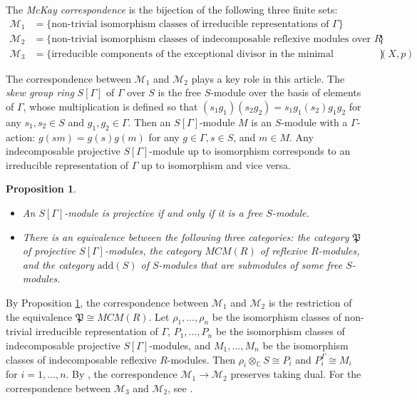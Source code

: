 \documentclass{amsart}[12pt]
\newtheorem{prop}[theorem]{Proposition}
\theoremstyle{definition}
\theoremstyle{remark}
\numberwithin{equation}{section}
\begin{document}
The \textit{McKay correspondence} is the bijection of the following three finite sets:
\begin{align*}
\mathcal{M}_1 & = \{\textrm{non-trivial isomorphism classes of irreducible representations of $\Gamma$}\} \\
\mathcal{M}_2 & = \{\textrm{non-trivial isomorphism classes of indecomposable reflexive modules over $R$}\} \\
\mathcal{M}_3 & = \{\textrm{irreducible components of the exceptional divisor in the minimal resolution of $(X, p)$}\}
\end{align*}

The correspondence between $\mathcal{M}_1$ and $\mathcal{M}_2$ plays a key role in this article. The \textit{skew group ring} $S[\Gamma]$ of $\Gamma$ over $S$ is the free $S$-module over the basis of elements of $\Gamma$, whose multiplication is defined so that $(s_1g_1)(s_2g_2) = s_1g_1(s_2)g_1g_2$ for any $s_1, s_2 \in S$ and $g_1, g_2 \in \Gamma$. Then an $S[\Gamma]$-module $M$ is an $S$-module with a $\Gamma$-action: $g(sm) = g(s)g(m)$ for any $g \in \Gamma, s \in S$, and $m \in M$. Any indecomposable projective $S[\Gamma]$-module up to isomorphism corresponds to an irreducible representation of $\Gamma$ up to isomorphism and vice versa.

\begin{prop}\cite[Lemma 1.1, Proposition 2.1, Proposition 2.2]{A86}\label{equicat}
\begin{itemize}
\item[(i)] An $S[\Gamma]$-module is projective if and only if it is a free $S$-module. 
\item[(ii)] There is an equivalence between the following three categories: the category $\mathfrak{P}$ of projective $S[\Gamma]$-modules, the category $MCM(R)$ of reflexive $R$-modules, and the category $\mathrm{add}(S)$ of $S$-modules that are submodules of some free $S$-modules. 
\end{itemize}
\end{prop}

By Proposition \ref{equicat}, the correspondence between $\mathcal{M}_1$ and $\mathcal{M}_2$ is the restriction of the equivalence $\mathfrak{P} \cong MCM(R)$. Let $\rho_1, \dots, \rho_n$ be the isomorphism classes of non-trivial irreducible representation of $\Gamma$, $P_1, \dots, P_n$ be the isomorphism classes of indecomposable projective $S[\Gamma]$-modules, and $M_1, \dots, M_n$  be the isomorphism classes of indecomposable reflexive $R$-modules. Then $\rho_i \otimes_{\mathbb{C}} S \cong P_i$ and $P_i^{\Gamma} \cong M_i$ for $i = 1, \dots, n$. By \cite[Lemma 3.1(a)]{A86}, the correspondence $\mathcal{M}_1 \to \mathcal{M}_2$ preserves taking dual. For the correspondence between $\mathcal{M}_3$ and $\mathcal{M}_2$, see \cite{AV85}.
\end{document}
